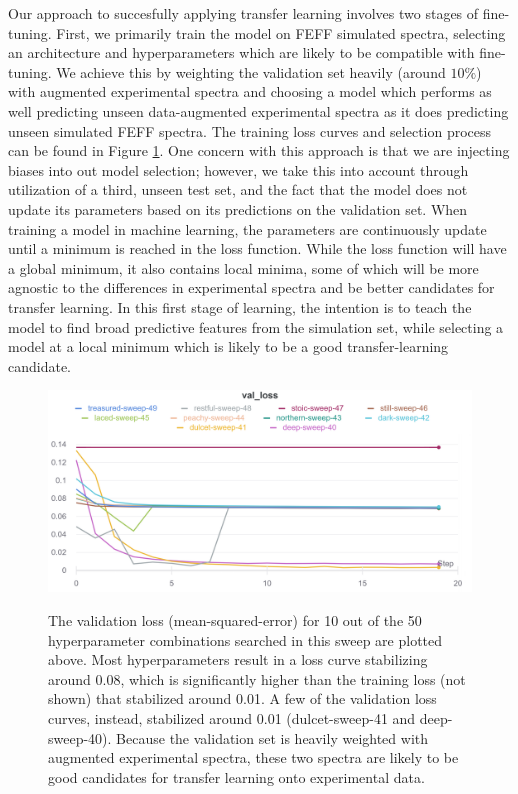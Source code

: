 \egroup

Our approach to succesfully applying transfer learning involves two stages of fine-tuning. First, we primarily  train the model on FEFF simulated spectra, selecting an architecture and hyperparameters which are likely to be compatible with fine-tuning. We achieve this by weighting the validation set heavily (around $ 10\% $) with augmented experimental spectra and choosing a model which performs as well predicting unseen data-augmented experimental spectra as it does predicting unseen simulated FEFF spectra. The training loss curves and selection process can be found in Figure \ref{fig:meta-1-sweep-loss}. One concern with this approach is that we are injecting biases into out model selection; however, we take this into account through utilization of a third, unseen test set, and the fact that the model does not update its parameters based on its predictions on the validation set. When training a model in machine learning, the parameters are continuously update until a minimum is reached in the loss function. While the loss function will have a global minimum, it also contains local minima, some of which will be more agnostic to the differences in experimental spectra and be better candidates for transfer learning. In this first stage of learning, the intention is to teach the model to find broad predictive features from the simulation set, while selecting a model at a local minimum which is likely to be a good transfer-learning candidate. 


\begin{figure}
    \centering
    \includegraphics[width=\linewidth]{Chapters/Figures/10-sweep.png}
    \label{fig:meta-1-sweep-loss}
    \caption[Hyperpamater Sweep 1]{The validation loss (mean-squared-error) for 10 out of the 50 hyperparameter combinations searched in this sweep are plotted above. Most hyperparameters result in a loss curve stabilizing around 0.08, which is significantly higher than the training loss (not shown) that stabilized around 0.01. A few of the validation loss curves, instead, stabilized around 0.01 (dulcet-sweep-41 and deep-sweep-40). Because the validation set is heavily weighted with augmented experimental spectra, these two spectra are likely to be good candidates for transfer learning onto experimental data.}
\end{figure}

